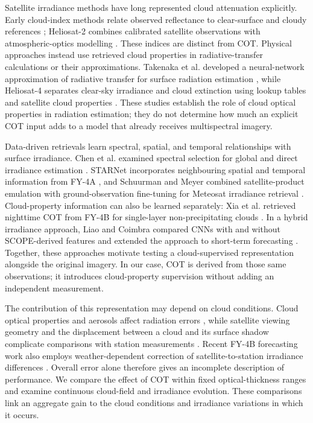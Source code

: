 \documentclass[11pt]{article}
\begin{document}
Satellite irradiance methods have long represented cloud attenuation explicitly. Early cloud-index methods relate observed reflectance to clear-surface and cloudy references \cite{cano1986}; Heliosat-2 combines calibrated satellite observations with atmospheric-optics modelling \cite{rigollier2004}. These indices are distinct from COT. Physical approaches instead use retrieved cloud properties in radiative-transfer calculations or their approximations. Takenaka et al. developed a neural-network approximation of radiative transfer for surface radiation estimation \cite{takenaka2011}, while Heliosat-4 separates clear-sky irradiance and cloud extinction using lookup tables and satellite cloud properties \cite{qu2017}. These studies establish the role of cloud optical properties in radiation estimation; they do not determine how much an explicit COT input adds to a model that already receives multispectral imagery.

Data-driven retrievals learn spectral, spatial, and temporal relationships with surface irradiance. Chen et al. examined spectral selection for global and direct irradiance estimation \cite{chen2023}. STARNet incorporates neighbouring spatial and temporal information from FY-4A \cite{song2025}, and Schuurman and Meyer combined satellite-product emulation with ground-observation fine-tuning for Meteosat irradiance retrieval \cite{schuurman2025}. Cloud-property information can also be learned separately: Xia et al. retrieved nighttime COT from FY-4B for single-layer non-precipitating clouds \cite{xia2025}. In a hybrid irradiance approach, Liao and Coimbra compared CNNs with and without SCOPE-derived features and extended the approach to short-term forecasting \cite{liao2024}. Together, these approaches motivate testing a cloud-supervised representation alongside the original imagery. In our case, COT is derived from those same observations; it introduces cloud-property supervision without adding an independent measurement.

The contribution of this representation may depend on cloud conditions. Cloud optical properties and aerosols affect radiation errors \cite{pap2024}, while satellite viewing geometry and the displacement between a cloud and its surface shadow complicate comparisons with station measurements \cite{wiltink2025}. Recent FY-4B forecasting work also employs weather-dependent correction of satellite-to-station irradiance differences \cite{shen2026fy4b}. Overall error alone therefore gives an incomplete description of performance. We compare the effect of COT within fixed optical-thickness ranges and examine continuous cloud-field and irradiance evolution. These comparisons link an aggregate gain to the cloud conditions and irradiance variations in which it occurs.
\end{document}
